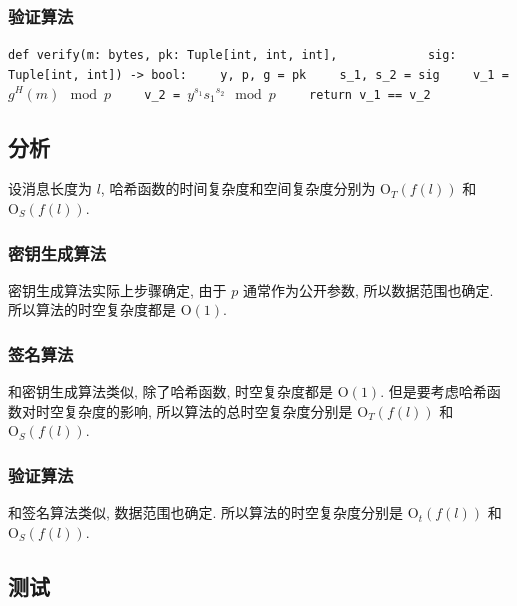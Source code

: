\documentclass[12pt,a4paper]{article}
\begin{document}
\subsubsection*{验证算法}

{
\noindent
\lstinline{def verify(m: bytes, pk: Tuple[int, int, int],}
\newline
\lstinline{            sig: Tuple[int, int]) -> bool:}
\newline
\lstinline{    y, p, g = pk}
\newline
\lstinline{    s_1, s_2 = sig}
\newline
\lstinline{    v_1 = }$ g^H(m) \mod p $
\newline
\lstinline{    v_2 = }$ y^{s_1} {s_1}^{s_2} \mod p $
\newline
\lstinline{    return v_1 == v_2}
}

\subsection*{分析}

设消息长度为 $ l $, 哈希函数的时间复杂度和空间复杂度分别为 $ \mathrm{O}_T(f(l)) $ 和 $ \mathrm{O}_S(f(l)) $. 

\subsubsection*{密钥生成算法}

密钥生成算法实际上步骤确定, 由于 $ p $ 通常作为公开参数, 所以数据范围也确定. 所以算法的时空复杂度都是 $ \mathrm{O}(1) $. 

\subsubsection*{签名算法}

和密钥生成算法类似, 除了哈希函数, 时空复杂度都是 $ \mathrm{O}(1) $. 但是要考虑哈希函数对时空复杂度的影响, 所以算法的总时空复杂度分别是 $ \mathrm{O}_T(f(l)) $ 和 $ \mathrm{O}_S(f(l)) $. 

\subsubsection*{验证算法}

和签名算法类似, 数据范围也确定. 所以算法的时空复杂度分别是 $ \mathrm{O}_t(f(l)) $ 和 $ \mathrm{O}_S(f(l)) $. 

\subsection*{测试}
\end{document}
